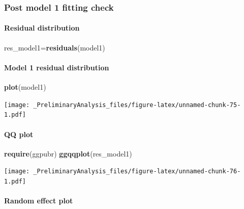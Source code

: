 \documentclass[
]{article}
\newenvironment{Shaded}{\begin{snugshade}}{\end{snugshade}}
\newcommand{\KeywordTok}[1]{\textcolor[rgb]{0.13,0.29,0.53}{\textbf{#1}}}
\newcommand{\NormalTok}[1]{#1}
\begin{document}
\hypertarget{post-model-1-fitting-check-4}{%
\subsubsection{Post model 1 fitting
check}\label{post-model-1-fitting-check-4}}

\hypertarget{residual-distribution-4}{%
\paragraph{Residual distribution}\label{residual-distribution-4}}

\begin{Shaded}
\begin{Highlighting}[]
\NormalTok{res_model1=}\KeywordTok{residuals}\NormalTok{(model1)}
\end{Highlighting}
\end{Shaded}

\hypertarget{model-1-residual-distribution-4}{%
\paragraph{Model 1 residual
distribution}\label{model-1-residual-distribution-4}}

\begin{Shaded}
\begin{Highlighting}[]
\KeywordTok{plot}\NormalTok{(model1)}
\end{Highlighting}
\end{Shaded}

\texttt{[image: \_PreliminaryAnalysis\_files/figure-latex/unnamed-chunk-75-1.pdf]}

\hypertarget{qq-plot-4}{%
\paragraph{QQ plot}\label{qq-plot-4}}

\begin{Shaded}
\begin{Highlighting}[]
\KeywordTok{require}\NormalTok{(ggpubr)}
\KeywordTok{ggqqplot}\NormalTok{(res_model1)}
\end{Highlighting}
\end{Shaded}

\texttt{[image: \_PreliminaryAnalysis\_files/figure-latex/unnamed-chunk-76-1.pdf]}

\hypertarget{random-effect-plot-4}{%
\paragraph{Random effect plot}\label{random-effect-plot-4}}
\end{document}
